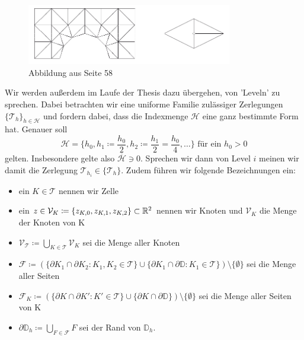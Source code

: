 \begin{figure}[H]
	\centering
	\includegraphics[width=0.8\textwidth]{triangulierung.png} \\
	Abbildung aus \cite{braess2013finite} Seite 58
\end{figure}
Wir werden außerdem im Laufe der Thesis dazu übergehen, von 'Leveln' zu sprechen. Dabei betrachten wir eine uniforme Familie zulässiger Zerlegungen $ \{\mathcal{T}_h\}_{h \in \mathcal{H}} $ und fordern dabei, dass die Indexmenge $ \mathcal{H} $ eine ganz bestimmte Form hat. Genauer soll \[ \mathcal{H} = \{ h_0 , h_1 \coloneqq \frac{h_0}{2},h_2 \coloneqq \frac{h_1}{2} = \frac{h_0}{4}, \dots \}  \text{ für ein }  h_0 > 0  \] gelten. Insbesondere gelte also $ \overline{\mathcal{H}} \ni 0 $. Sprechen wir dann von Level $ i $ meinen wir damit die Zerlegung $\mathcal{T}_{h_i} \in \{\mathcal{T}_h\}$.
Zudem führen wir folgende Bezeichnungen ein:
\begin{itemize}
	\item ein $ K \in \mathcal{T} $ nennen wir Zelle
	\item ein $ z \in \mathcal{V}_K \coloneqq \{ z_{K,0} , z_{K,1} , z_{K,2}\} \subset \mathbb{R}^2 $ nennen wir Knoten und $\mathcal{V}_K$ die Menge der Knoten von K
	\item $ \mathcal{V}_{\mathcal{T}} \coloneqq \bigcup_{K \in \mathcal{T}} \mathcal{V}_K $ sei die Menge aller Knoten
	\item $\mathcal{F}  \coloneqq (\{ \partial K_1 \cap \partial K_2 : K_1,K_2 \in \mathcal{T} \} \cup \{ \partial K_1 \cap \partial \mathbb{D} : K_1 \in \mathcal{T} \}) \setminus \{\emptyset\} $ sei die Menge aller Seiten
	\item $ \mathcal{F}_K \coloneqq (\{ \partial K \cap \partial K' : K' \in \mathcal{T} \} \cup \{ \partial K \cap \partial \mathbb{D} \}) \setminus \{ \emptyset \} $ sei die Menge aller Seiten von K 
	\item $ \partial \mathbb{D}_h \coloneqq \bigcup_{F \in \mathcal{F}} F $ sei der Rand von $ \mathbb{D}_h $.
\end{itemize}

